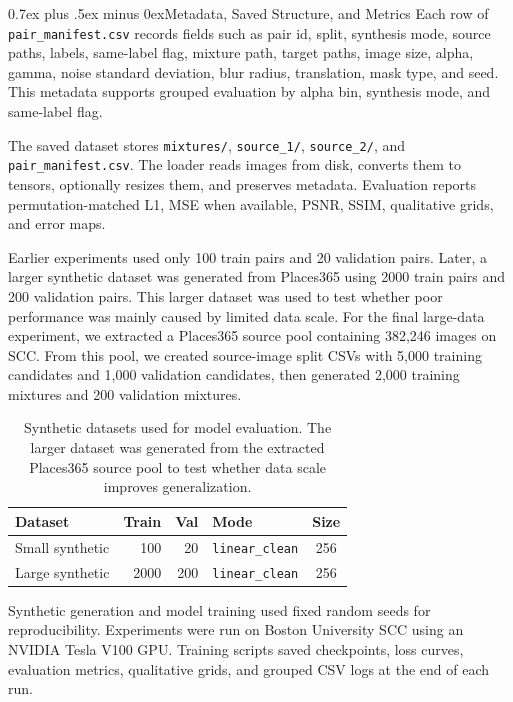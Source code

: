 \documentclass[conference]{IEEEtran}
\makeatletter
\def\subsection{\@startsection{subsection}{2}{\z@}{1.5ex plus 1.5ex minus 0.5ex}%
  {0.7ex plus .5ex minus 0ex}{\normalfont\normalsize\bfseries}}
\makeatother
\begin{document}
\subsection{Metadata, Saved Structure, and Metrics}
Each row of \texttt{pair\_manifest.csv} records fields such as pair id, split, synthesis mode, source paths, labels, same-label flag, mixture path, target paths, image size, alpha, gamma, noise standard deviation, blur radius, translation, mask type, and seed. This metadata supports grouped evaluation by alpha bin, synthesis mode, and same-label flag.

The saved dataset stores \texttt{mixtures/}, \texttt{source\_1/}, \texttt{source\_2/}, and \texttt{pair\_manifest.csv}. The loader reads images from disk, converts them to tensors, optionally resizes them, and preserves metadata. Evaluation reports permutation-matched L1, MSE when available, PSNR, SSIM, qualitative grids, and error maps.

Earlier experiments used only 100 train pairs and 20 validation pairs. Later, a larger synthetic dataset was generated from Places365 using 2000 train pairs and 200 validation pairs. This larger dataset was used to test whether poor performance was mainly caused by limited data scale. For the final large-data experiment, we extracted a Places365 source pool containing 382,246 images on SCC. From this pool, we created source-image split CSVs with 5,000 training candidates and 1,000 validation candidates, then generated 2,000 training mixtures and 200 validation mixtures.

\begin{table}[t]
\centering
\small
\begin{tabular}{lrrlc}
\toprule
Dataset & Train & Val & Mode & Size\\
\midrule
Small synthetic & 100 & 20 & \texttt{linear\_clean} & 256\\
Large synthetic & 2000 & 200 & \texttt{linear\_clean} & 256\\
\bottomrule
\end{tabular}
\caption{Synthetic datasets used for model evaluation. The larger dataset was generated from the extracted Places365 source pool to test whether data scale improves generalization.}
\label{tab:datasets}
\end{table}

Synthetic generation and model training used fixed random seeds for reproducibility. Experiments were run on Boston University SCC using an NVIDIA Tesla V100 GPU. Training scripts saved checkpoints, loss curves, evaluation metrics, qualitative grids, and grouped CSV logs at the end of each run.
\end{document}
